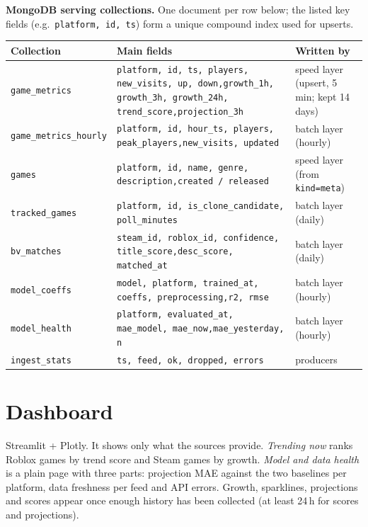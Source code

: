 \documentclass[10pt,a4paper]{article}
\newcommand{\ep}[1]{\texttt{\small #1}}
\begin{document}
\textbf{MongoDB serving collections.} One document per row below; the listed key fields (e.g.\ \ep{platform, id, ts}) form a unique compound index used for upserts.

{\small
\begin{longtable}{L{3.4cm} L{6.6cm} L{4.0cm}}
\toprule
\textbf{Collection} & \textbf{Main fields} & \textbf{Written by}\\
\midrule\endhead
\ep{game\_metrics} & \ep{platform, id, ts, players, new\_visits, up, down,}\newline\ep{growth\_1h, growth\_3h, growth\_24h, trend\_score,}\newline\ep{projection\_3h} & speed layer (upsert, 5\,min; kept 14 days)\\
\ep{game\_metrics\_hourly} & \ep{platform, id, hour\_ts, players, peak\_players,}\newline\ep{new\_visits, updated} & batch layer (hourly)\\
\ep{games} & \ep{platform, id, name, genre, description,}\newline\ep{created / released} & speed layer (from \ep{kind=meta})\\
\ep{tracked\_games} & \ep{platform, id, is\_clone\_candidate, poll\_minutes} & batch layer (daily)\\
\ep{bv\_matches} & \ep{steam\_id, roblox\_id, confidence, title\_score,}\newline\ep{desc\_score, matched\_at} & batch layer (daily)\\
\ep{model\_coeffs} & \ep{model, platform, trained\_at, coeffs, preprocessing,}\newline\ep{r2, rmse} & batch layer (hourly)\\
\ep{model\_health} & \ep{platform, evaluated\_at, mae\_model, mae\_now,}\newline\ep{mae\_yesterday, n} & batch layer (hourly)\\
\ep{ingest\_stats} & \ep{ts, feed, ok, dropped, errors} & producers\\
\bottomrule
\end{longtable}}

\section{Dashboard}
Streamlit + Plotly. It shows only what the sources provide. \emph{Trending now} ranks Roblox games by trend score and Steam games by growth. \emph{Model and data health} is a plain page with three parts: projection MAE against the two baselines per platform, data freshness per feed and API errors. Growth, sparklines, projections and scores appear once enough history has been collected (at least 24\,h for scores and projections).
\end{document}
